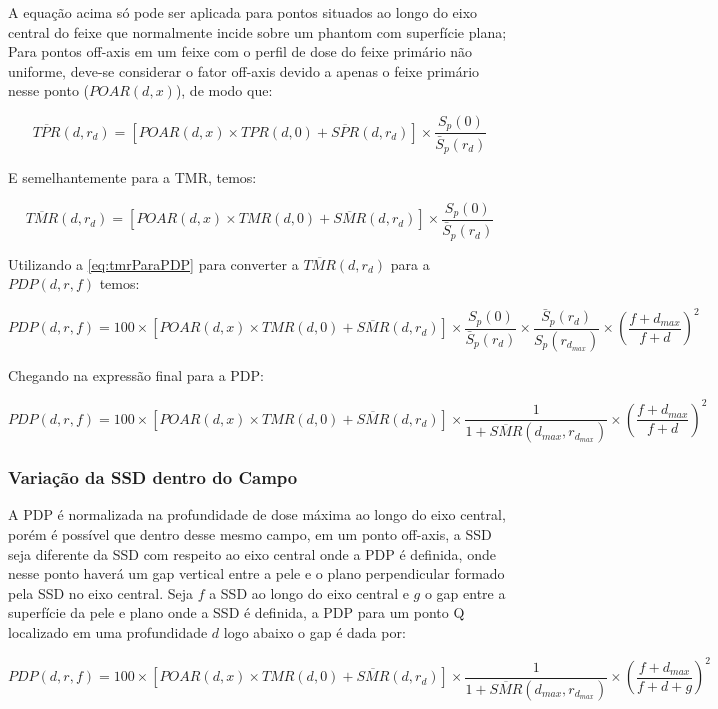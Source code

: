 \documentclass[11pt,a4paper]{article}
\begin{document}
        A equação acima só pode ser aplicada para pontos situados ao longo do eixo central do feixe que normalmente incide sobre um phantom com superfície plana; Para pontos off-axis em um feixe com o perfil de dose do feixe primário não uniforme, deve-se considerar o fator off-axis devido a apenas o feixe primário nesse ponto ($ POAR(d, x)$), de modo que:

        $$\overline{TPR}(d, r_d) = \left[POAR(d, x) \times TPR(d, 0) + \overline{SPR}(d, r_d)\right] \times \frac{S_p(0)}{\bar{S}_p(r_d)}$$

        E semelhantemente para a TMR, temos:
     
        $$\overline{TMR}(d, r_d) = \left[POAR(d, x) \times TMR(d, 0) + \overline{SMR}(d, r_d)\right] \times \frac{S_p(0)}{\bar{S}_p(r_d)}$$


       Utilizando a \ref{eq:tmrParaPDP} para converter a $\overline{TMR}(d,r_d)$ para a $PDP(d, r, f)$ temos:

        $$PDP(d, r, f) = 100 \times \left[POAR(d,x) \times TMR(d,0) + \overline{SMR}(d, r_d) \right] \times \frac{S_p(0)}{\bar{S}_p(r_d)} \times \frac{\bar{S}_p(r_d)}{S_p(r_{d_{max}})} \times \left(\frac{f + d_{max}}{f + d}\right)^2$$

        Chegando na expressão final para a PDP:

        \begin{equation}
            PDP(d, r, f) = 100 \times \left[POAR(d,x) \times TMR(d,0) + \overline{SMR}(d, r_d) \right] \times \frac{1}{1 + \overline{SMR}(d_{max}, r_{d_{max}})} \times \left(\frac{f + d_{max}}{f + d}\right)^2
        \end{equation}

\subsubsection*{Variação da SSD dentro do Campo}

        A PDP é normalizada na profundidade de dose máxima ao longo do eixo central, porém é possível que dentro desse mesmo campo, em um ponto off-axis, a SSD seja diferente da SSD com respeito ao eixo central onde a PDP é definida, onde nesse ponto haverá um gap vertical entre a pele e o plano perpendicular formado pela SSD no eixo central. Seja $f$ a SSD ao longo do eixo central e $g$ o gap entre a superfície da pele e plano onde a SSD é definida, a PDP para um ponto Q localizado em uma profundidade $d$ logo abaixo o gap é dada por:

            \begin{equation}
                PDP(d, r, f) = 100 \times \left[POAR(d,x) \times TMR(d,0) + \overline{SMR}(d, r_d) \right] \times \frac{1}{1 + \overline{SMR}(d_{max}, r_{d_{max}})} \times \left(\frac{f + d_{max}}{f + d + g}\right)^2
            \end{equation}
\end{document}

